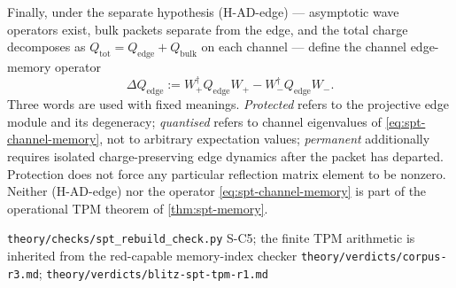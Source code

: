 \begin{definition}
Finally, under the separate hypothesis (H-AD-edge) --- asymptotic wave
operators exist, bulk packets separate from the edge, and the total charge
decomposes as $Q_{\mathrm{tot}}=Q_{\mathrm{edge}}+Q_{\mathrm{bulk}}$ on each
channel --- define the channel edge-memory operator
\begin{equation}
  \Delta Q_{\mathrm{edge}}
   := W_+^{\dagger}Q_{\mathrm{edge}}W_+ - W_-^{\dagger}Q_{\mathrm{edge}}W_- .
  \label{eq:spt-channel-memory}
\end{equation}
Three words are used with fixed meanings. \emph{Protected} refers to the
projective edge module and its degeneracy; \emph{quantised} refers to channel
eigenvalues of \eqref{eq:spt-channel-memory}, not to arbitrary expectation
values; \emph{permanent} additionally requires isolated charge-preserving edge
dynamics after the packet has departed. Protection does not force any
particular reflection matrix element to be nonzero. Neither (H-AD-edge) nor
the operator \eqref{eq:spt-channel-memory} is part of the operational TPM
theorem of \cref{thm:spt-memory}.
\end{definition}

%
{\texttt{theory/checks/spt\_rebuild\_check.py} S-C5; the finite TPM arithmetic
is inherited from the red-capable memory-index checker}%
{\texttt{theory/verdicts/corpus-r3.md};
\texttt{theory/verdicts/blitz-spt-tpm-r1.md}}

